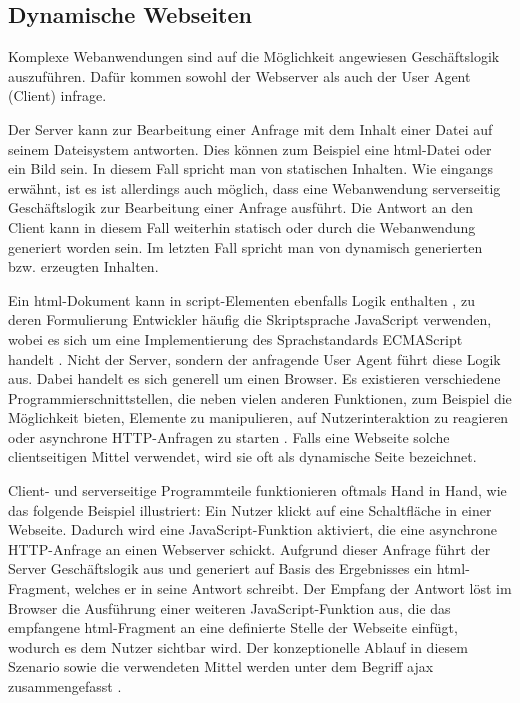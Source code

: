         \subsection{Dynamische Webseiten}
            Komplexe Webanwendungen sind auf die Möglichkeit angewiesen Geschäftslogik auszuführen.
            Dafür kommen sowohl der Webserver als auch der User Agent (Client) infrage.

            Der Server kann zur Bearbeitung einer Anfrage mit dem Inhalt einer Datei auf seinem Dateisystem antworten.
            Dies können zum Beispiel eine \gls{html}-Datei oder ein Bild sein.
            In diesem Fall spricht man von statischen Inhalten.
            Wie eingangs erwähnt, ist es ist allerdings auch möglich,
            dass eine Webanwendung serverseitig Geschäftslogik zur Bearbeitung einer Anfrage ausführt.
            Die Antwort an den Client kann in diesem Fall weiterhin statisch oder
            durch die Webanwendung generiert worden sein.
            Im letzten Fall spricht man von dynamisch generierten bzw. erzeugten Inhalten.

            Ein \gls{html}-Dokument kann in script-Elementen ebenfalls Logik enthalten
            \cite[Kapitel 4.11]{w3c:html5},
            zu deren Formulierung Entwickler häufig die Skriptsprache JavaScript verwenden,
            wobei es sich um eine Implementierung des Sprachstandards ECMAScript handelt
            \cite{ecma:ecmaScript}.
            Nicht der Server, sondern der anfragende User Agent führt diese Logik aus.
            Dabei handelt es sich generell um einen Browser.
            Es existieren verschiedene Programmierschnittstellen,
            die neben vielen anderen Funktionen, zum Beispiel die Möglichkeit bieten,
            Elemente zu manipulieren, auf Nutzerinteraktion zu reagieren
            oder asynchrone HTTP-Anfragen zu starten \cite[Kapitel 8]{whatwg:html}\cite{whatwg:xhr}.
            Falls eine Webseite solche clientseitigen Mittel verwendet,
            wird sie oft als dynamische Seite bezeichnet.
            
            Client- und serverseitige Programmteile funktionieren oftmals Hand in Hand,
            wie das folgende Beispiel illustriert:
            Ein Nutzer klickt auf eine Schaltfläche in einer Webseite.
            Dadurch wird eine JavaScript-Funktion aktiviert,
            die eine asynchrone HTTP-Anfrage an einen Webserver schickt.
            Aufgrund dieser Anfrage führt der Server Geschäftslogik aus
            und generiert auf Basis des Ergebnisses ein \gls{html}-Fragment,
            welches er in seine Antwort schreibt.
            Der Empfang der Antwort löst im Browser die Ausführung einer weiteren
            JavaScript-Funktion aus, die das empfangene \gls{html}-Fragment
            an eine definierte Stelle der Webseite einfügt,
            wodurch es dem Nutzer sichtbar wird.
            Der konzeptionelle Ablauf in diesem Szenario sowie die verwendeten Mittel
            werden unter dem Begriff \gls{ajax} zusammengefasst \cite{garrett:ajax}.

